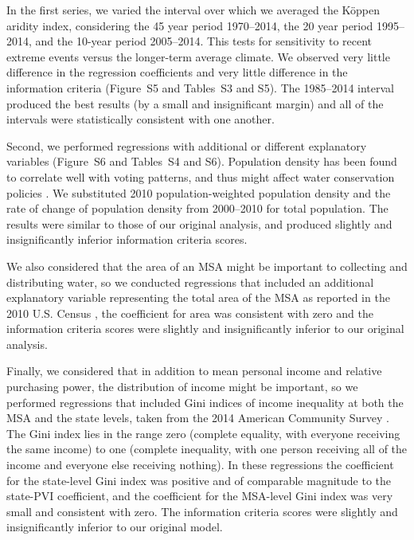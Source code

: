 \documentclass[draft]{agujournal}
\begin{document}
In the first series, we varied the interval over which we averaged
the K\"oppen aridity index, considering the 45 year period 1970--2014,
the 20 year period 1995--2014, and the 10-year period 2005--2014. This tests
for sensitivity to recent extreme events versus the longer-term average
climate. We observed very little difference in the regression coefficients
and very little difference in the information criteria
(Figure~S5 and Tables~S3 and S5).
The 1985--2014 interval produced the best results (by a small and insignificant
margin)
and  all of the intervals were statistically consistent with one another.

Second, we performed regressions with additional or different explanatory
variables (Figure~S6 and Tables~S4 and S6).
Population density has been found to correlate well with
voting patterns, and thus might affect water conservation policies
\citep{rodden:geographic:2010}.
We substituted 2010 population-weighted population density
and the rate of change of population density from 2000--2010
\citep{wilson:pop.density:2012}
for total population.
The results were similar to those of our original analysis,
and produced slightly and insignificantly inferior information criteria scores.

We also considered that the area of an MSA might be important to collecting and
distributing water, so we conducted regressions that included an additional
explanatory variable representing the total area of the MSA as reported
in the 2010 U.S. Census
\citep{wilson:pop.density:2012}, the coefficient
for area was consistent with zero and the information criteria scores were
slightly and insignificantly inferior to our original analysis.

Finally, we considered that in addition to mean personal
income and relative purchasing power, the distribution of income might be
important, so we performed regressions that included Gini indices of
income inequality at both the MSA and the state levels,
taken from the 2014 American Community Survey \citep{acs:gini:2017}.
The Gini index lies in the range
zero (complete equality, with everyone receiving the same income)
to one (complete inequality, with one person receiving all of the income and
everyone else receiving nothing).
In these regressions the coefficient for the state-level Gini index was
positive and of comparable magnitude to the state-PVI coefficient,
and the coefficient for the MSA-level Gini index was very small and consistent
with zero.
The information criteria scores were slightly and insignificantly inferior
to our original model.
\end{document}
